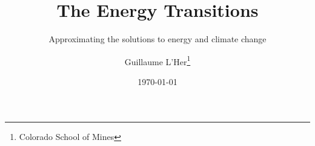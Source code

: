 \documentclass[
    a4paper, %
    fontsize=10pt, %
    twoside=false, %
	numbers=noenddot, %
]{kaobook}
\begin{document}

\titlehead{Climate Change and Energy}

\title[The Energy Transition]{The Energy Transitions}
\subtitle{Approximating the solutions to energy and climate change}

\author[Guillaume L'Her]{Guillaume L'Her\thanks{Colorado School of Mines}}

\date{\today}

\publishers{Hope is for Suckers}


\frontmatter %




\makeatletter
\uppertitleback{\@titlehead} %
\end{document}
